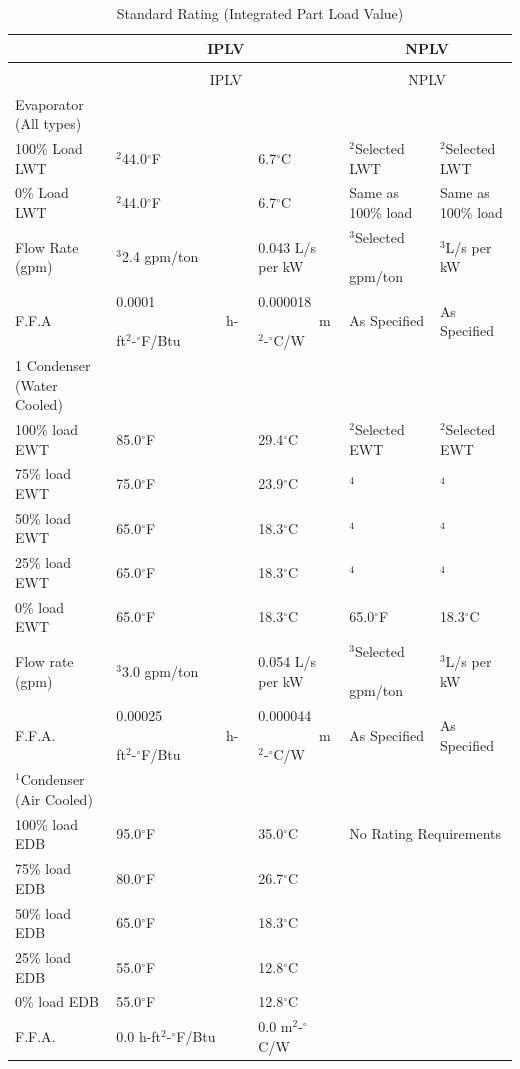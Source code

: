 \begin{longtable}[c]{p{1.2in}p{1.2in}p{1.2in}p{1.2in}p{1.2in}}
\caption{Standard Rating (Integrated Part Load Value) \label{table:standard-rating-integrated-part-load-value}} \tabularnewline
\toprule
 & \multicolumn{2}{c}{IPLV} & \multicolumn{2}{c}{NPLV} \tabularnewline
\midrule
\endfirsthead

\caption[]{Standard Rating (Integrated Part Load Value)} \tabularnewline
\toprule
 & \multicolumn{2}{c}{IPLV} & \multicolumn{2}{c}{NPLV} \tabularnewline
\midrule
\endhead

Evaporator (All types) & & & & \tabularnewline
100\% Load LWT & \(^{2}\)44.0\(^{\circ}\)F & 6.7\(^{\circ}\)C & \(^{2}\)Selected LWT & \(^{2}\)Selected LWT \tabularnewline
0\% Load LWT & \(^{2}\)44.0\(^{\circ}\)F & 6.7\(^{\circ}\)C & Same as 100\% load & Same as 100\% load \tabularnewline
Flow Rate (gpm) & \(^{3}\)2.4 gpm/ton & 0.043 L/s per kW & \(^{3}\)Selected ~~~~~~~~ gpm/ton & \(^{3}\)L/s per kW \tabularnewline
F.F.A & 0.0001 ~~~~~~~~~~~~~~~ h-ft\(^{2}\)-\(^{\circ}\)F/Btu & 0.000018 ~~~~~~~~ m\(^{2}\)-\(^{\circ}\)C/W & As Specified & As Specified \tabularnewline
\midrule
1 Condenser (Water  Cooled) & & & & \tabularnewline
100\% load EWT & 85.0\(^{\circ}\)F & 29.4\(^{\circ}\)C & \(^{2}\)Selected EWT & \(^{2}\)Selected EWT \tabularnewline
75\% load EWT & 75.0\(^{\circ}\)F & 23.9\(^{\circ}\)C & \(^{4}\) & \(^{4}\) \tabularnewline
50\% load EWT & 65.0\(^{\circ}\)F & 18.3\(^{\circ}\)C & \(^{4}\) & \(^{4}\) \tabularnewline
25\% load EWT & 65.0\(^{\circ}\)F & 18.3\(^{\circ}\)C & \(^{4}\) & \(^{4}\) \tabularnewline
0\% load EWT & 65.0\(^{\circ}\)F & 18.3\(^{\circ}\)C & 65.0\(^{\circ}\)F & 18.3\(^{\circ}\)C \tabularnewline
Flow rate (gpm) & \(^{3}\)3.0 gpm/ton & 0.054 L/s per kW & \(^{3}\)Selected ~~~~~~~~ gpm/ton & \(^{3}\)L/s per kW \tabularnewline
F.F.A. & 0.00025 ~~~~~~~~~~~~~~~ h-ft\(^{2}\)-\(^{\circ}\)F/Btu & 0.000044 ~~~~~~~~ m\(^{2}\)-\(^{\circ}\)C/W & As Specified & As Specified \tabularnewline
\midrule
\(^{1}\)Condenser (Air Cooled) & & & & \tabularnewline
100\% load EDB & 95.0\(^{\circ}\)F & 35.0\(^{\circ}\)C & \multicolumn{2}{l}{No Rating Requirements} \tabularnewline
75\% load EDB & 80.0\(^{\circ}\)F & 26.7\(^{\circ}\)C & & \tabularnewline
50\% load EDB & 65.0\(^{\circ}\)F & 18.3\(^{\circ}\)C & & \tabularnewline
25\% load EDB & 55.0\(^{\circ}\)F & 12.8\(^{\circ}\)C & & \tabularnewline
0\% load EDB & 55.0\(^{\circ}\)F & 12.8\(^{\circ}\)C & & \tabularnewline
F.F.A. & 0.0 h-ft\(^{2}\)-\(^{\circ}\)F/Btu & 0.0 m\(^{2}\)-\(^{\circ}\)C/W & & \tabularnewline
\midrule

\end{longtable}
